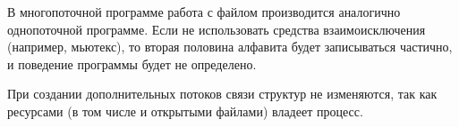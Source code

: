 \documentclass[a4paper,14pt]{extarticle}
\begin{document}






В многопоточной программе работа с файлом производится аналогично однопоточной программе. Если не использовать средства взаимоисключения (например, мьютекс), то вторая половина алфавита будет записываться частично, и поведение программы будет не определено.

При создании дополнительных потоков связи структур не изменяются, так как ресурсами (в том числе и открытыми файлами) владеет процесс.
\end{document}
